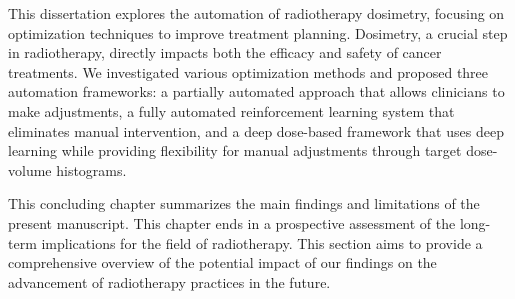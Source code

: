 This dissertation explores the automation of radiotherapy dosimetry, focusing on optimization techniques to improve treatment planning.
Dosimetry, a crucial step in radiotherapy, directly impacts both the efficacy and safety of cancer treatments.
We investigated various optimization methods and proposed three automation frameworks:
a partially automated approach that allows clinicians to make adjustments,
a fully automated reinforcement learning system that eliminates manual intervention,
and a deep dose-based framework that uses deep learning while providing flexibility for manual adjustments through target dose-volume histograms.

This concluding chapter summarizes the main findings and limitations of the present manuscript.
This chapter ends in a prospective assessment of the long-term implications for the field of radiotherapy.
This section aims to provide a comprehensive overview of the potential impact of our findings on the advancement of radiotherapy practices in the future.
